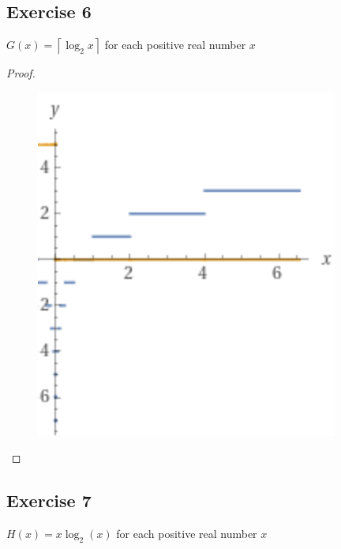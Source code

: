 \documentclass[14pt]{extarticle}
\newcommand{\ceil}[1]{{\left\lceil#1\right\rceil}}
\begin{document}
\subsection{Exercise 6}
\(G(x) = \ceil{\log_2 x}\) for each positive real number \(x\)

\begin{proof}
\begin{figure}[ht!]
\centering
\includegraphics[scale=0.5]{../images/11.4.6.png}
\end{figure}
\end{proof}

\subsection{Exercise 7}
\(H(x) = x \log_2(x)\) for each positive real number \(x\)
\end{document}
